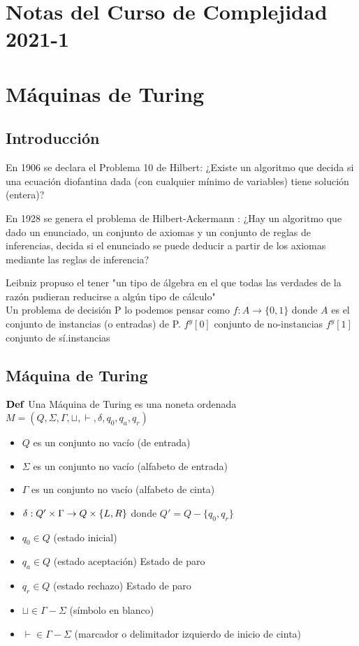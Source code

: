 \documentclass{homework}
\begin{document}
\section*{\LARGE{Notas del Curso de Complejidad 2021-1}}

\section{M\'aquinas de Turing}

\subsection{Introducci\'on}
En 1906 se declara el Problema 10 de Hilbert:
¿Existe un algoritmo que decida si una ecuación diofantina dada (con cualquier mínimo de variables) tiene solución (entera)?

En 1928 se genera el problema de Hilbert-Ackermann :
¿Hay un algoritmo que dado un enunciado, un conjunto de axiomas y un conjunto de reglas de inferencias, decida si el enunciado se puede deducir a partir de los axiomas mediante las reglas de inferencia?

Leibniz propuso el tener "un tipo de álgebra en el que todas las verdades de la razón pudieran reducirse a algún tipo de cálculo"\\

Un problema de decisión P lo podemos pensar como $f : A \rightarrow \{0,1\}$ donde $A$ es el conjunto de instancias (o entradas) de P.
$f^{y}[0]$ conjunto de no-instancias
$f^{y}[1]$ conjunto de sí.instancias

\subsection{M\'aquina de Turing}
$\bf{Def}$ Una Máquina de Turing es una noneta ordenada $M = (Q, \Sigma, \Gamma,\sqcup, \vdash, \delta, q_0, q_a, q_r )$
\begin{itemize}
	\item $Q$ es un conjunto no vacío (de entrada)
	\item $\Sigma$ es un conjunto no vacío (alfabeto de entrada)
	\item $\Gamma$ es un conjunto no vacío (alfabeto de cinta)
	\item $\delta : Q' \times \Gamma \rightarrow Q \time \Gamma \times \{L,R\}$ donde $Q' = Q - \{q_0, q_r\}$
	\item $q_0 \in Q$ (estado inicial)
	\item $q_a \in Q$ (estado aceptación) Estado de paro
	\item $q_r \in Q$ (estado rechazo) Estado de paro
	\item $\sqcup \in \Gamma - \Sigma$ (símbolo en blanco)
	\item $\vdash \in \Gamma - \Sigma$ (marcador o delimitador izquierdo de inicio de cinta)
\end{itemize}
\end{document}
